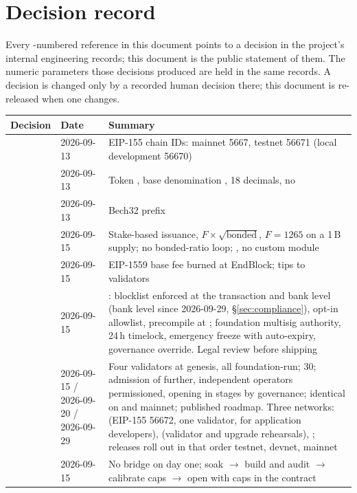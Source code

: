 \section{Decision record}
\label{app:decisions}

Every -numbered reference in this document points to a decision in
the project's internal engineering records; this document is the public
statement of them. The numeric parameters those decisions produced are held in
the same records. A decision is changed only by a recorded human decision
there; this document is re-released when one changes.

\begin{table}[H]
\centering
\small
\begin{tabularx}{\textwidth}{@{}llL@{}}
\toprule
Decision & Date & Summary \\
\midrule
{} & 2026-09-13 & EIP-155 chain IDs: mainnet 5667, testnet 56671 (local development 56670) \\
 & 2026-09-13 & Token \kash{}, base denomination \esp{}, 18 decimals, no  \\
 & 2026-09-13 & Bech32 prefix  \\
 & 2026-09-15 & Stake-based issuance, $F \times \sqrt{\text{bonded}}$, $F = 1265$ on a 1\,B supply; no bonded-ratio loop;  , no custom module \\
 & 2026-09-15 & EIP-1559 base fee burned at EndBlock; tips to validators \\
 & 2026-09-15 & : blocklist enforced at the transaction and bank level (bank level since 2026-09-29, \S\ref{sec:compliance}), opt-in allowlist, precompile at ; foundation multisig authority, 24\,h timelock, emergency freeze with auto-expiry, governance override. Legal review before shipping \\
 & 2026-09-15 / 2026-09-20 / 2026-09-29 & Four validators at genesis, all foundation-run;  30; admission of further, independent operators permissioned, opening in stages by governance; identical on  and mainnet; published roadmap. Three networks:  (EIP-155 56672, one validator, for application developers),  (validator and upgrade rehearsals), ; releases roll out in that order testnet, devnet, mainnet \\
 & 2026-09-15 & No bridge on day one; soak $\to$ build and audit $\to$ calibrate caps $\to$ open with caps in the contract \\

\end{tabularx}
\end{table}
